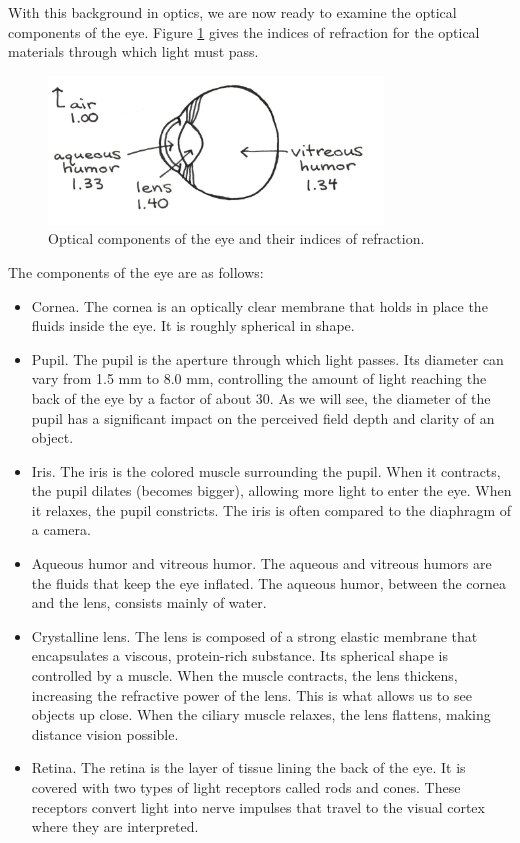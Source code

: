 With this background in optics, we are now ready to examine the optical components of the eye.  Figure \ref{Fig5-8} gives the indices of refraction for the optical materials through which light must pass.
\begin{figure}[h]
	\centering
	\includegraphics[width=3.5in]{./figures/Topic5/Fig5-8.png}
	\caption{Optical components of the eye and their indices of refraction.}
	\label{Fig5-8}
\end{figure}
The components of the eye are as follows:
\begin{itemize}
\item Cornea.  The cornea is an optically clear membrane that holds in place the fluids inside the eye.  It is roughly spherical in shape.
\item Pupil.  The pupil is the aperture through which light passes.  Its diameter can vary from 1.5 mm to 8.0 mm, controlling the amount of light reaching the back of the eye by a factor of about 30.  As we will see, the diameter of the pupil has a significant impact on the perceived field depth and clarity of an object.
\item Iris.  The iris is the colored muscle surrounding the pupil.  When it contracts, the pupil dilates (becomes bigger), allowing more light to enter the eye.  When it relaxes, the pupil constricts.  The iris is often compared to the diaphragm of a camera.
\item Aqueous humor and vitreous humor.  The aqueous and vitreous humors are the fluids that keep the eye inflated.  The aqueous humor, between the cornea and the lens, consists mainly of water.
\item Crystalline lens.  The lens is composed of a strong elastic membrane that encapsulates a viscous, protein-rich substance.  Its spherical shape is controlled by a muscle.  When the muscle contracts, the lens thickens, increasing the refractive power of the lens.  This is what allows us to see objects up close.  When the ciliary muscle relaxes, the lens flattens, making distance vision possible.
\item Retina.  The retina is the layer of tissue lining the back of the eye.  It is covered with two types of light receptors called rods and cones.  These receptors convert light into nerve impulses that travel to the visual cortex where they are interpreted.
\end{itemize}
 
